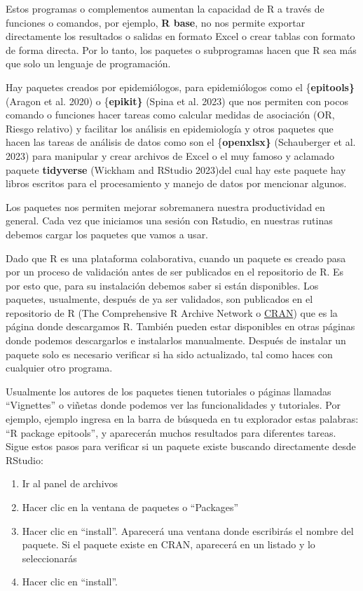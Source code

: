 \documentclass[
  letterpaper,
  DIV=11,
  numbers=noendperiod]{scrreprt}
\providecommand{\tightlist}{%
  \setlength{\itemsep}{0pt}\setlength{\parskip}{0pt}}\usepackage{longtable,booktabs,array}
\begin{document}
Estos programas o complementos aumentan la capacidad de R a través de
funciones o comandos, por ejemplo, \textbf{R base}, no nos permite
exportar directamente los resultados o salidas en formato Excel o crear
tablas con formato de forma directa. Por lo tanto, los paquetes o
subprogramas hacen que R sea más que solo un lenguaje de programación.

Hay paquetes creados por epidemiólogos, para epidemiólogos como el
\{\textbf{epitools\}} (Aragon et al. 2020) o \{\textbf{epikit\}} (Spina
et al. 2023) que nos permiten con pocos comando o funciones hacer tareas
como calcular medidas de asociación (OR, Riesgo relativo) y facilitar
los análisis en epidemiología y otros paquetes que hacen las tareas de
análisis de datos como son el \{\textbf{openxlsx\}} (Schauberger et al.
2023) para manipular y crear archivos de Excel o el muy famoso y
aclamado paquete \textbf{tidyverse} (Wickham and RStudio 2023)del cual
hay este paquete hay libros escritos para el procesamiento y manejo de
datos por mencionar algunos.

Los paquetes nos permiten mejorar sobremanera nuestra productividad en
general. Cada vez que iniciamos una sesión con Rstudio, en nuestras
rutinas debemos cargar los paquetes que vamos a usar.

Dado que R es una plataforma colaborativa, cuando un paquete es creado
pasa por un proceso de validación antes de ser publicados en el
repositorio de R. Es por esto que, para su instalación debemos saber si
están disponibles. Los paquetes, usualmente, después de ya ser
validados, son publicados en el repositorio de R (The Comprehensive R
Archive Network o \href{https://cran.r-project.org/web/packages/}{CRAN})
que es la página donde descargamos R. También pueden estar disponibles
en otras páginas donde podemos descargarlos e instalarlos manualmente.
Después de instalar un paquete solo es necesario verificar si ha sido
actualizado, tal como haces con cualquier otro programa.

Usualmente los autores de los paquetes tienen tutoriales o páginas
llamadas ``Vignettes'' o viñetas donde podemos ver las funcionalidades y
tutoriales. Por ejemplo, ejemplo ingresa en la barra de búsqueda en tu
explorador estas palabras: ``R package epitools'', y aparecerán muchos
resultados para diferentes tareas. Sigue estos pasos para verificar si
un paquete existe buscando directamente desde RStudio:

\begin{enumerate}
\def\labelenumi{\arabic{enumi}.}
\tightlist
\item
  Ir al panel de archivos
\item
  Hacer clic en la ventana de paquetes o ``Packages''
\item
  Hacer clic en ``install''. Aparecerá una ventana donde escribirás el
  nombre del paquete. Si el paquete existe en CRAN, aparecerá en un
  listado y lo seleccionarás
\item
  Hacer clic en ``install''.
\end{enumerate}
\end{document}
